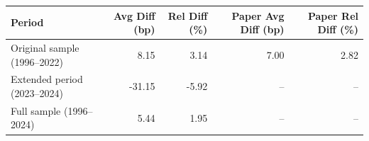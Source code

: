 \begin{tabular}{lrrrr}
\toprule
Period & Avg Diff (bp) & Rel Diff (\%) & Paper Avg Diff (bp) & Paper Rel Diff (\%) \\
\midrule
Original sample (1996--2022) & 8.15 & 3.14 & 7.00 & 2.82 \\
Extended period (2023--2024) & -31.15 & -5.92 & -- & -- \\
Full sample (1996--2024) & 5.44 & 1.95 & -- & -- \\
\bottomrule
\end{tabular}
